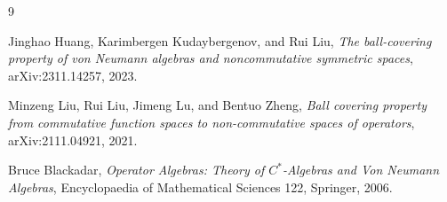 \documentclass[11pt]{article}
\begin{document}
\begin{thebibliography}{9}

Jinghao Huang, Karimbergen Kudaybergenov, and Rui Liu,
\emph{The ball-covering property of von Neumann algebras and noncommutative
symmetric spaces},
arXiv:2311.14257, 2023.

Minzeng Liu, Rui Liu, Jimeng Lu, and Bentuo Zheng,
\emph{Ball covering property from commutative function spaces to
non-commutative spaces of operators},
arXiv:2111.04921, 2021.

Bruce Blackadar,
\emph{Operator Algebras: Theory of \(C^*\)-Algebras and Von Neumann
Algebras},
Encyclopaedia of Mathematical Sciences 122, Springer, 2006.

\end{thebibliography}
\end{document}

